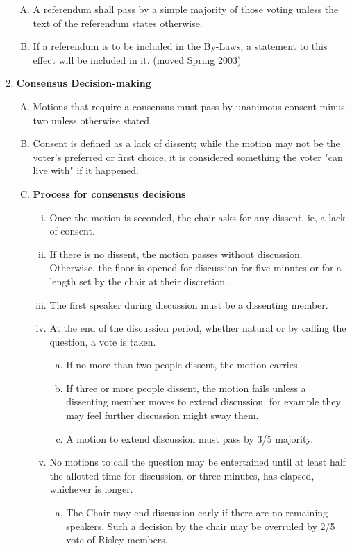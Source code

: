 \documentclass[12pt]{article}
\begin{document}
\begin{enumerate}[1.]
\begin{enumerate}[A.]
\item A referendum shall pass by a simple majority of those voting unless the text of the referendum states otherwise.
\item If a referendum is to be included in the By-Laws, a statement to this effect will be included in it. (moved Spring 2003)
\end{enumerate}
\item \textbf{Consensus Decision-making}
\begin{enumerate}[A.]
\item Motions that require a consensus must pass by unanimous consent minus two unless otherwise stated.
\item Consent is defined as a lack of dissent; while the motion may not be the voter's preferred or first choice, it is considered something the voter "can live with" if it happened.
\item \textbf{Process for consensus decisions}
\begin{enumerate}[i.]
\item Once the motion is seconded, the chair asks for any dissent, ie, a lack of consent.
\item If there is no dissent, the motion passes without discussion. Otherwise, the floor is opened for discussion for five minutes or for a length set by the chair at their discretion.
\item The first speaker during discussion must be a dissenting member.
\item At the end of the discussion period, whether natural or by calling the question, a vote is taken.
\begin{enumerate}[a.]
\item If no more than two people dissent, the motion carries.
\item If three or more people dissent, the motion fails unless a dissenting member moves to extend discussion, for example they may feel further discussion might sway them.
\item A motion to extend discussion must pass by 3/5 majority.
\end{enumerate}
\item No motions to call the question may be entertained until at least half the allotted time for discussion, or three minutes, has elapsed, whichever is longer.
\begin{enumerate}[a.]
\item The Chair may end discussion early if there are no remaining speakers. Such a decision by the chair may be overruled by 2/5 vote of Risley members.
\end{enumerate}
\end{enumerate}
\end{enumerate}
\end{enumerate}
\end{document}
